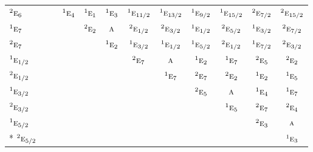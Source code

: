 \documentclass[10pt,a4paper]{article}
\numberwithin{equation}{section}
\newcommand{\irr}[1]{\text{\normalfont\scshape #1}}
\newcommand{\conjpair}[1]{{}^{#1}}
\begin{document}
{\begin{longtable}{@{}lccccccccccc@{}}
$\conjpair{2}\irr{e}_{6}$ &  &  & $\conjpair{1}\irr{e}_{4}$ & $\conjpair{1}\irr{e}_{1}$ & $\conjpair{1}\irr{e}_{3}$ & $\conjpair{1}\irr{e}_{11/2}$ & $\conjpair{1}\irr{e}_{13/2}$ & $\conjpair{1}\irr{e}_{9/2}$ & $\conjpair{1}\irr{e}_{15/2}$ & $\conjpair{2}\irr{e}_{7/2}$ & $\conjpair{2}\irr{e}_{15/2}$\\
$\conjpair{1}\irr{e}_{7}$ &  &  &  & $\conjpair{2}\irr{e}_{2}$ & $\irr{a}$ & $\conjpair{2}\irr{e}_{1/2}$ & $\conjpair{2}\irr{e}_{3/2}$ & $\conjpair{1}\irr{e}_{1/2}$ & $\conjpair{2}\irr{e}_{5/2}$ & $\conjpair{1}\irr{e}_{3/2}$ & $\conjpair{2}\irr{e}_{7/2}$\\
$\conjpair{2}\irr{e}_{7}$ &  &  &  &  & $\conjpair{1}\irr{e}_{2}$ & $\conjpair{1}\irr{e}_{3/2}$ & $\conjpair{1}\irr{e}_{1/2}$ & $\conjpair{1}\irr{e}_{5/2}$ & $\conjpair{2}\irr{e}_{1/2}$ & $\conjpair{1}\irr{e}_{7/2}$ & $\conjpair{2}\irr{e}_{3/2}$\\
$\conjpair{1}\irr{e}_{1/2}$ &  &  &  &  &  & $\conjpair{2}\irr{e}_{7}$ & $\irr{a}$ & $\conjpair{1}\irr{e}_{2}$ & $\conjpair{1}\irr{e}_{7}$ & $\conjpair{2}\irr{e}_{5}$ & $\conjpair{2}\irr{e}_{2}$\\
$\conjpair{2}\irr{e}_{1/2}$ &  &  &  &  &  &  & $\conjpair{1}\irr{e}_{7}$ & $\conjpair{2}\irr{e}_{7}$ & $\conjpair{2}\irr{e}_{2}$ & $\conjpair{1}\irr{e}_{2}$ & $\conjpair{1}\irr{e}_{5}$\\
$\conjpair{1}\irr{e}_{3/2}$ &  &  &  &  &  &  &  & $\conjpair{2}\irr{e}_{5}$ & $\irr{a}$ & $\conjpair{1}\irr{e}_{4}$ & $\conjpair{1}\irr{e}_{7}$\\
$\conjpair{2}\irr{e}_{3/2}$ &  &  &  &  &  &  &  &  & $\conjpair{1}\irr{e}_{5}$ & $\conjpair{2}\irr{e}_{7}$ & $\conjpair{2}\irr{e}_{4}$\\
$\conjpair{1}\irr{e}_{5/2}$ &  &  &  &  &  &  &  &  &  & $\conjpair{2}\irr{e}_{3}$ & $\irr{a}$\\*
$\conjpair{2}\irr{e}_{5/2}$ &  &  &  &  &  &  &  &  &  &  & $\conjpair{1}\irr{e}_{3}$\\
\bottomrule\end{longtable}}
\end{document}
